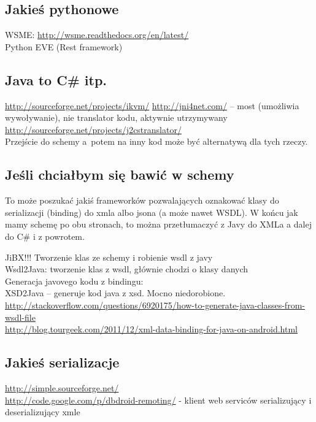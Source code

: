 \subsection{Jakieś pythonowe}
WSME: \url{http://wsme.readthedocs.org/en/latest/}\\
Python EVE (Rest framework)\\


\subsection{Java to C\# itp.}
\url{http://sourceforge.net/projects/ikvm/}
\url{http://jni4net.com/} -- most (umożliwia wywoływanie), nie translator kodu, aktywnie utrzymywany \\
\url{http://sourceforge.net/projects/j2cstranslator/}\\
Przejście do schemy a~potem na inny kod może być alternatywą dla tych rzeczy.


\subsection{Jeśli chciałbym się bawić w schemy}
To może poszukać jakiś frameworków pozwalających oznakować klasy do serializacji (binding) do xmla albo jsona (a może nawet WSDL).
W końcu jak mamy schemę po obu stronach, to można przetłumaczyć z Javy do XMLa a dalej do C\# i z powrotem.

JiBX!!! Tworzenie klas ze schemy i robienie wsdl z javy\\
Wsdl2Java: tworzenie klas z wsdl, głównie chodzi o klasy danych\\

Generacja javovego kodu z bindingu:\\
XSD2Java – generuje kod java z xsd. Mocno niedorobione.\\

\url{http://stackoverflow.com/questions/6920175/how-to-generate-java-classes-from-wsdl-file}\\
\url{http://blog.tourgeek.com/2011/12/xml-data-binding-for-java-on-android.html}\\

\subsection{Jakieś serializacje}
\url{http://simple.sourceforge.net/}\\
\url{http://code.google.com/p/dbdroid-remoting/} - klient web serviców serializujący i deserializujący xmle\\


